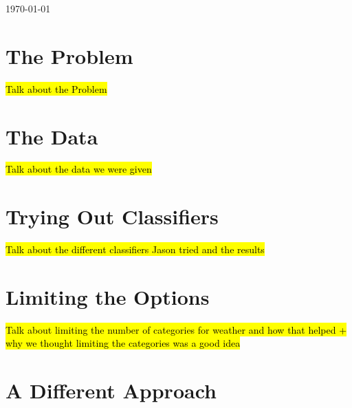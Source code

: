 \begin{titlepage}

{\large \today}\\[2cm] %


 

\vfill %

\end{titlepage}

\section{The Problem}

\hl{Talk about the Problem}

\section{The Data}

\hl{Talk about the data we were given}

\section{Trying Out Classifiers}

\hl{Talk about the different classifiers Jason tried and the results}

\section{Limiting the Options}

\hl{Talk about limiting the number of categories for weather and how that helped + why we thought limiting the categories was a good idea}

\section{A Different Approach}

